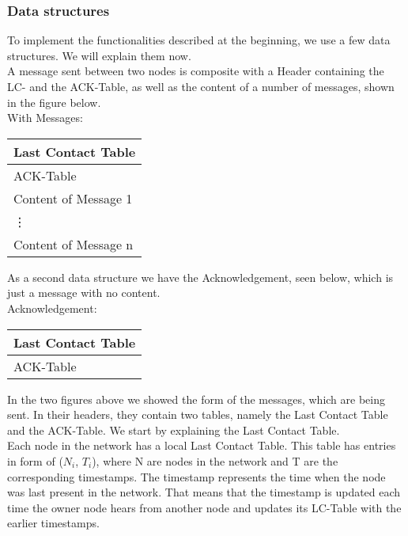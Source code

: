 	\subsubsection{Data structures}
	To implement the functionalities described at the beginning, we use a few data structures. We will explain them now. \\

	A message sent between two nodes is composite with a Header containing the LC- and the ACK-Table, as well as the content of a number of messages, shown in the figure below. \\

	With Messages:
		\begin{center}
			\begin{tabular}{ | l |}
				\hline
				Last Contact Table \\ \hline
				ACK-Table \\ \hline
				Content of Message 1\\ \hline
				\vdots\\ \hline
				Content of Message n\\ \hline
			\end{tabular}
		\end{center}


As a second data structure we have the Acknowledgement, seen below, which is just a message with no content. \\


	Acknowledgement:
		\begin{center}
			\begin{tabular}{ | l |}
				\hline
				Last Contact Table \\ \hline
				ACK-Table \\ \hline
			\end{tabular}
		\end{center}
			
In the two figures above we showed the form of the messages, which are being sent. In their headers, they contain two tables, namely the Last Contact Table and the ACK-Table. We start by explaining the Last Contact Table. \\

Each node in the network has a local Last Contact Table. This table has entries in form of ($N_{i}$, $T_{i}$), where N are nodes in the network and T are the corresponding timestamps. The timestamp represents the time when the node was last present in the network. That means that the timestamp is updated each time the owner node hears from another node and updates its LC-Table with the earlier timestamps. \\

